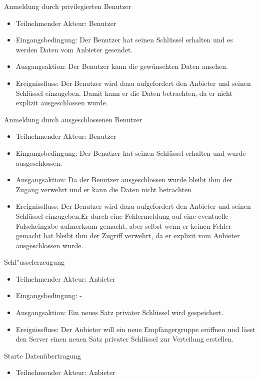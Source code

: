 \documentclass[a4paper,10pt]{scrartcl}
\begin{document}
\begin{usecase}
 {Anmeldung durch privilegierten Benutzer
   \begin{itemize}
   \item Teilnehmender Akteur: Benutzer
   \item Eingangsbedingung: Der Benutzer hat seinen Schlüssel erhalten und es werden Daten vom Anbieter
                            gesendet.
   \item Ausgangsaktion: Der Benutzer kann die gewünschten Daten ansehen.
   \item Ereignissfluss: Der Benutzer wird dazu aufgefordert den Anbieter und seinen Schlüssel
         einzugeben. Damit kann er die Daten betrachten, da er nicht explizit ausgeschlossen wurde.
   \end{itemize}
}
 {Anmeldung durch ausgeschlossenen Benutzer
   \begin{itemize}
   \item Teilnehmender Akteur: Benutzer
   \item Eingangsbedingung: Der Benutzer hat seinen Schlüssel erhalten und wurde ausgeschlossen.
   \item Ausgangsaktion:  Da der Benutzer ausgeschlossen wurde bleibt ihm der Zugang verwehrt und er kann
             die Daten nicht betrachten
   \item Ereignissfluss: Der Benutzer wird dazu aufgefordert den Anbieter und seinen Schlüssel
         einzugeben.Er durch eine Fehlermeldung auf eine eventuelle Falscheingabe aufmerksam gemacht, aber selbst wenn er keinen
         Fehler gemacht hat bleibt ihm der Zugriff verwehrt, da er explizit vom Anbieter ausgeschlossen wurde.
   \end{itemize}
}
 {Schl"usselerzeugung
   \begin{itemize}
   \item Teilnehmender Akteur: Anbieter
   \item Eingangsbedingung: -
   \item Ausgangsaktion: Ein neues Satz privater Schlüssel wird gespeichert.
   \item Ereignissfluss: Der Anbieter will ein neue Empfängergruppe eröffnen und lässt
         den Server einen neuen Satz privater Schlüssel zur Verteilung erstellen.
   \end{itemize}
}
 {Starte Datenübertragung
   \begin{itemize}
   \item Teilnehmender Akteur: Anbieter

\end{itemize}}
\end{usecase}
\end{document}
